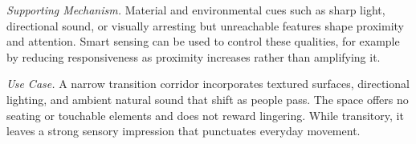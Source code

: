 \emph{Supporting Mechanism.} Material and environmental cues such as sharp light, directional sound, or visually arresting but unreachable features shape proximity and attention. Smart sensing can be used to control these qualities, for example by reducing responsiveness as proximity increases rather than amplifying it.

\emph{Use Case.} A narrow transition corridor incorporates textured surfaces, directional lighting, and ambient natural sound that shift as people pass. The space offers no seating or touchable elements and does not reward lingering. While transitory, it leaves a strong sensory impression that punctuates everyday movement.

\begingroup
\fontsize{6.8}{8.1}\selectfont
\setlength{\tabcolsep}{2.1pt}
\renewcommand{\arraystretch}{1.04}
\setlength{\LTleft}{0pt}
\setlength{\LTright}{0pt}

